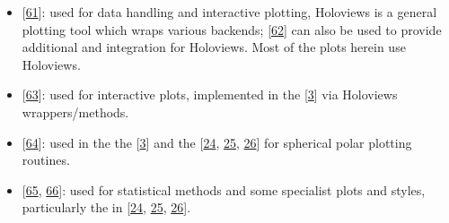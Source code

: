 \documentclass[letterpaper,table,10pt,english]{jupyterBook}
\begin{document}
\begin{itemize}
\begin{itemize}
\item {} 
\sphinxAtStartPar
{} {[}\hyperlink{cite.backmatter/bibliography:id677}{61}{]}: used for data handling and interactive plotting, Holoviews is a general plotting tool which wraps various backends;  {[}\hyperlink{cite.backmatter/bibliography:id682}{62}{]} can also be used to provide additional  and  integration for Holoviews. Most of the plots herein use Holoviews.

\item {} 
\sphinxAtStartPar
{} {[}\hyperlink{cite.backmatter/bibliography:id526}{63}{]}: used for interactive plots, implemented in the  {[}\hyperlink{cite.backmatter/bibliography:id668}{3}{]} via Holoviews wrappers/methods.

\item {} 
\sphinxAtStartPar
{} {[}\hyperlink{cite.backmatter/bibliography:id807}{64}{]}: used in the the  {[}\hyperlink{cite.backmatter/bibliography:id668}{3}{]} and the  {[}\hyperlink{cite.backmatter/bibliography:id655}{24}, \hyperlink{cite.backmatter/bibliography:id597}{25}, \hyperlink{cite.backmatter/bibliography:id595}{26}{]} for spherical polar plotting routines.

\item {} 
\sphinxAtStartPar
{} {[}\hyperlink{cite.backmatter/bibliography:id858}{65}, \hyperlink{cite.backmatter/bibliography:id933}{66}{]}: used for statistical methods and some specialist plots and styles, particularly the  in  {[}\hyperlink{cite.backmatter/bibliography:id655}{24}, \hyperlink{cite.backmatter/bibliography:id597}{25}, \hyperlink{cite.backmatter/bibliography:id595}{26}{]}.

\end{itemize}


\end{itemize}
\end{document}
